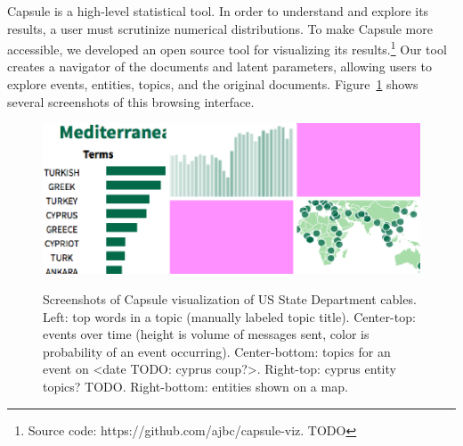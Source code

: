 Capsule is a high-level statistical tool. In order to understand and explore its results, a user must scrutinize numerical distributions.
To make Capsule more accessible, we developed an open source tool for visualizing its results.\footnote{Source code: https://github.com/ajbc/capsule-viz. TODO}  Our tool creates a navigator of the documents and latent parameters, allowing users to explore events, entities, topics, and the original documents.  Figure~\ref{fig:viz} shows several screenshots of this browsing interface.

\begin{figure}
\centering
\includegraphics[width=\linewidth]{fig/viz.png}
\label{fig:viz}
\vskip -12pt
\caption{Screenshots of Capsule visualization of US State Department cables.  Left: top words in a topic (manually labeled topic title).  Center-top: events over time (height is volume of messages sent, color is probability of an event occurring).  Center-bottom: topics for an event on <date TODO: cyprus coup?>.  Right-top: cyprus entity topics? TODO.  Right-bottom: entities shown on a map.}
\end{figure}

